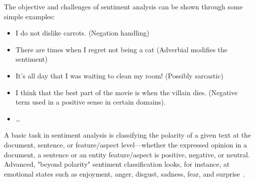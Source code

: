 The objective and challenges of sentiment analysis can be shown through some simple examples:
\begin{itemize}
	\item I do not dislike carrots. (Negation handling)
	\item There are times when I regret not being a cat (Adverbial modifies the sentiment)
	\item It's all day that I was waiting to clean my room! (Possibly sarcastic)
	\item I think that the best part of the movie is when the villain dies. (Negative term used in a positive sense in certain domains).
	\item \ldots
\end{itemize}

A basic task in sentiment analysis is classifying the polarity of a given text at the document, sentence, or feature/aspect level—whether the expressed opinion in a document, a sentence or an entity feature/aspect is positive, negative, or neutral. Advanced, "beyond polarity" sentiment classification looks, for instance, at emotional states such as enjoyment, anger, disgust, sadness, fear, and surprise~\cite{enwiki:1024880646}.

